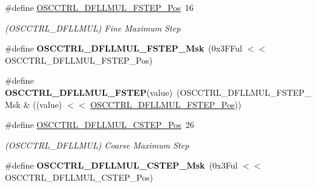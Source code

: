 \begin{DoxyCompactItemize}
\item 
\hypertarget{group___s_a_m_l21___o_s_c_c_t_r_l_ga4f5fe6a1887b7f8b49c1ff906c00d3c0}{}\#define \hyperlink{group___s_a_m_l21___o_s_c_c_t_r_l_ga4f5fe6a1887b7f8b49c1ff906c00d3c0}{O\+S\+C\+C\+T\+R\+L\+\_\+\+D\+F\+L\+L\+M\+U\+L\+\_\+\+F\+S\+T\+E\+P\+\_\+\+Pos}~16\label{group___s_a_m_l21___o_s_c_c_t_r_l_ga4f5fe6a1887b7f8b49c1ff906c00d3c0}

\begin{DoxyCompactList}\small\item\em (O\+S\+C\+C\+T\+R\+L\+\_\+\+D\+F\+L\+L\+M\+U\+L) Fine Maximum Step \end{DoxyCompactList}\item 
\hypertarget{group___s_a_m_l21___o_s_c_c_t_r_l_ga1fcd8f516ba8d5d394b99530702a88b9}{}\#define {\bfseries O\+S\+C\+C\+T\+R\+L\+\_\+\+D\+F\+L\+L\+M\+U\+L\+\_\+\+F\+S\+T\+E\+P\+\_\+\+Msk}~(0x3\+F\+Ful $<$$<$ O\+S\+C\+C\+T\+R\+L\+\_\+\+D\+F\+L\+L\+M\+U\+L\+\_\+\+F\+S\+T\+E\+P\+\_\+\+Pos)\label{group___s_a_m_l21___o_s_c_c_t_r_l_ga1fcd8f516ba8d5d394b99530702a88b9}

\item 
\hypertarget{group___s_a_m_l21___o_s_c_c_t_r_l_gaf661d687140afe20719156610ad934d5}{}\#define {\bfseries O\+S\+C\+C\+T\+R\+L\+\_\+\+D\+F\+L\+L\+M\+U\+L\+\_\+\+F\+S\+T\+E\+P}(value)~(O\+S\+C\+C\+T\+R\+L\+\_\+\+D\+F\+L\+L\+M\+U\+L\+\_\+\+F\+S\+T\+E\+P\+\_\+\+Msk \& ((value) $<$$<$ \hyperlink{group___s_a_m_l21___o_s_c_c_t_r_l_ga4f5fe6a1887b7f8b49c1ff906c00d3c0}{O\+S\+C\+C\+T\+R\+L\+\_\+\+D\+F\+L\+L\+M\+U\+L\+\_\+\+F\+S\+T\+E\+P\+\_\+\+Pos}))\label{group___s_a_m_l21___o_s_c_c_t_r_l_gaf661d687140afe20719156610ad934d5}

\item 
\hypertarget{group___s_a_m_l21___o_s_c_c_t_r_l_ga0c8450b117abc6c2de82b7b1fc96297a}{}\#define \hyperlink{group___s_a_m_l21___o_s_c_c_t_r_l_ga0c8450b117abc6c2de82b7b1fc96297a}{O\+S\+C\+C\+T\+R\+L\+\_\+\+D\+F\+L\+L\+M\+U\+L\+\_\+\+C\+S\+T\+E\+P\+\_\+\+Pos}~26\label{group___s_a_m_l21___o_s_c_c_t_r_l_ga0c8450b117abc6c2de82b7b1fc96297a}

\begin{DoxyCompactList}\small\item\em (O\+S\+C\+C\+T\+R\+L\+\_\+\+D\+F\+L\+L\+M\+U\+L) Coarse Maximum Step \end{DoxyCompactList}\item 
\hypertarget{group___s_a_m_l21___o_s_c_c_t_r_l_gab378f7dcaf7fb31551d2508299445f2a}{}\#define {\bfseries O\+S\+C\+C\+T\+R\+L\+\_\+\+D\+F\+L\+L\+M\+U\+L\+\_\+\+C\+S\+T\+E\+P\+\_\+\+Msk}~(0x3\+Ful $<$$<$ O\+S\+C\+C\+T\+R\+L\+\_\+\+D\+F\+L\+L\+M\+U\+L\+\_\+\+C\+S\+T\+E\+P\+\_\+\+Pos)\label{group___s_a_m_l21___o_s_c_c_t_r_l_gab378f7dcaf7fb31551d2508299445f2a}


\end{DoxyCompactItemize}
